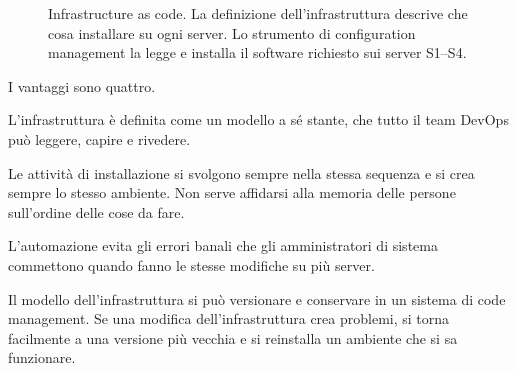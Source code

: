 \begin{figure}[ht]
\centering
{}
\caption{Infrastructure as code. La definizione dell'infrastruttura descrive che cosa installare su ogni server. Lo
strumento di configuration management la legge e installa il software richiesto sui server S1--S4.}
\label{fig:devops-iac}
\end{figure}

I vantaggi sono quattro.
\begin{description}[leftmargin=0pt, style=unboxed]
  \item[Visibility.] L'infrastruttura è definita come un modello a sé stante, che tutto il team DevOps può leggere,
    capire e rivedere.
  \item[Reproducibility.] Le attività di installazione si svolgono sempre nella stessa sequenza e si crea sempre lo
    stesso ambiente. Non serve affidarsi alla memoria delle persone sull'ordine delle cose da fare.
  \item[Reliability.] L'automazione evita gli errori banali che gli amministratori di sistema commettono quando fanno
    le stesse modifiche su più server.
  \item[Recovery.] Il modello dell'infrastruttura si può versionare e conservare in un sistema di code management. Se
    una modifica dell'infrastruttura crea problemi, si torna facilmente a una versione più vecchia e si reinstalla un
    ambiente che si sa funzionare.
\end{description}

